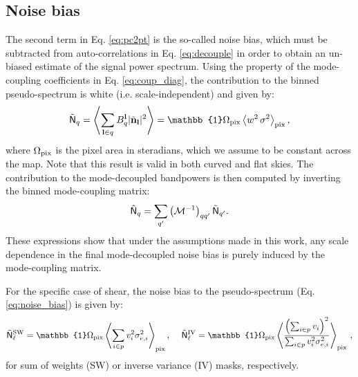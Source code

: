 \documentclass[a4paper,11pt]{article}
\begin{document}
    \subsection{Noise bias}\label{ssec:pcl.noise}
    The second term in Eq. \ref{eq:pc2pt} is the so-called noise bias, which must be subtracted from auto-correlations in Eq. \ref{eq:decouple} in order to obtain an un-biased estimate of the signal power spectrum. Using the property of the mode-coupling coefficients in Eq. \ref{eq:coup_diag}, the contribution to the binned pseudo-spectrum is white (i.e. scale-independent) and given by:
      \begin{equation}\label{eq:noise_bias}
        \tilde{\sf N}_q=\left\langle\sum_{{\bf l}\in q} B_q^{\bf l} |\tilde{\bf n}_{\bf l}|^2\right\rangle=\mathbb{1}\Omega_{\rm pix}\left\langle w^2\,\sigma^2\right\rangle_{\rm pix},
      \end{equation}
      where $\Omega_{\rm pix}$ is the pixel area in steradians, which we assume to be constant across the map. Note that this result is valid in both curved and flat skies. The contribution to the mode-decoupled bandpowers is then computed by inverting the binned mode-coupling matrix:
      \begin{equation}
        \hat{\sf N}_q = \sum_{q'}\left(\mathcal{M}^{-1}\right)_{qq'}\tilde{\sf N}_{q'}.
      \end{equation}
      These expressions show that under the assumptions made in this work, any scale dependence in the final mode-decoupled noise bias is purely induced by the mode-coupling matrix.
      
      For the specific case of shear, the noise bias to the pseudo-spectrum (Eq. \ref{eq:noise_bias}) is given by:
        \begin{equation}\label{eq:noise_bias_shear}
          \tilde{\sf N}^{\rm SW}_\ell=\mathbb{1}\Omega_{\rm pix}\left\langle \sum_{i\in p} v_i^2\sigma_{e,i}^2\right\rangle_{\rm pix},
          \hspace{12pt}
          \tilde{\sf N}^{\rm IV}_\ell=\mathbb{1}\Omega_{\rm pix}\left\langle \frac{\left(\sum_{i\in p}v_i\right)^2}{\sum_{i\in p} v_i^2\sigma_{e,i}^2}\right\rangle_{\rm pix}\,,
        \end{equation}
        for sum of weights (SW) or inverse variance (IV) masks, respectively.
\end{document}
